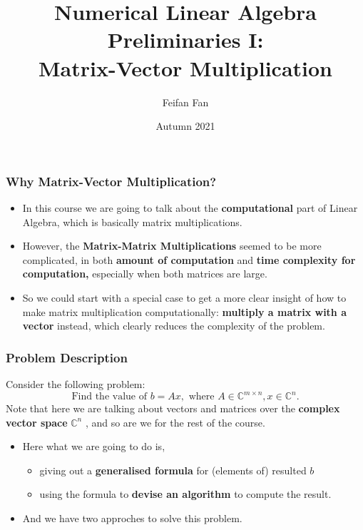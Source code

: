 \documentclass{beamer}
\title[Computational Linear Algebra]{Numerical Linear Algebra Preliminaries I: \\ Matrix-Vector Multiplication} %
\author{Feifan Fan} %
\institute[Imperial College London] %
{
Imperial College London \\ %
\medskip
\textit{feifan.fan19@imperial.ac.uk} %
}
\date{Autumn 2021} %
\begin{document}
\begin{frame}
\titlepage %
\end{frame}


\begin{frame}
\frametitle{Why Matrix-Vector Multiplication?}
\begin{itemize}
    \item In this course we are going to talk about the \textbf{computational} part of Linear Algebra, which is basically matrix multiplications. 
    \item However, the \textbf{Matrix-Matrix Multiplications} seemed to be more complicated, in both \textbf{amount of computation} and \textbf{time complexity for computation,} especially when both matrices are large.
    \item So we could start with a special case to get a more clear insight of how to make matrix multiplication computationally: \textbf{multiply a matrix with a vector} instead, which clearly reduces the complexity of the problem.
\end{itemize}
\end{frame}


\begin{frame}
    \frametitle{Problem Description}
    Consider the following problem:
        \[
            \text{Find the value of } b = Ax, \text{ where } A \in \mathbb{C}^{m \times n}, x \in \mathbb{C}^{n}
        .\]
    Note that here we are talking about vectors and matrices over the \textbf{complex vector space} \(\mathbb{C}^{n}\) , and so are we for the rest of the course. \medskip
    
    
    \begin{itemize}
        \item Here what we are going to do is,
            \begin{itemize}
                \item giving out a \textbf{generalised formula} for (elements of) resulted \(b\)
                \item using the formula to \textbf{devise an algorithm} to compute the result.
            \end{itemize}
        \item And we have two approches to solve this problem.
    \end{itemize}
\end{frame}
\end{document}
